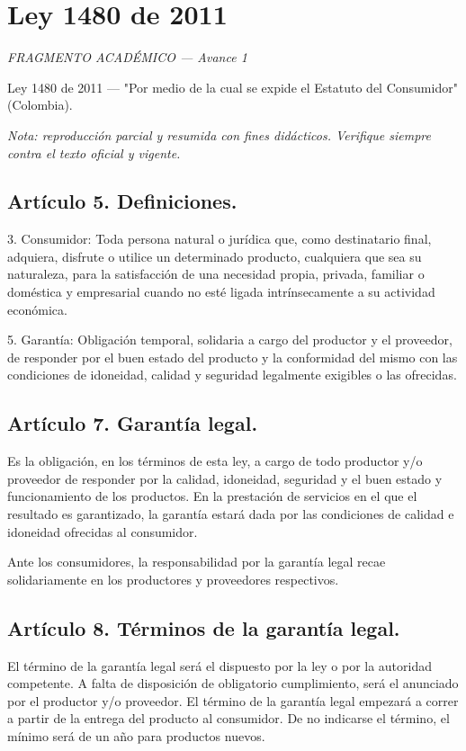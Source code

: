 \documentclass[11pt,a4paper]{article}
\begin{document}
\section*{Ley 1480 de 2011}

\textit{FRAGMENTO ACADÉMICO — Avance 1}

Ley 1480 de 2011 — "Por medio de la cual se expide el Estatuto del Consumidor" (Colombia).

\textit{Nota: reproducción parcial y resumida con fines didácticos. Verifique siempre contra el texto oficial y vigente.}

\subsection*{Artículo 5. Definiciones.}

3. Consumidor: Toda persona natural o jurídica que, como destinatario final, adquiera, disfrute o utilice un determinado producto, cualquiera que sea su naturaleza, para la satisfacción de una necesidad propia, privada, familiar o doméstica y empresarial cuando no esté ligada intrínsecamente a su actividad económica.

5. Garantía: Obligación temporal, solidaria a cargo del productor y el proveedor, de responder por el buen estado del producto y la conformidad del mismo con las condiciones de idoneidad, calidad y seguridad legalmente exigibles o las ofrecidas.

\subsection*{Artículo 7. Garantía legal.}

Es la obligación, en los términos de esta ley, a cargo de todo productor y/o proveedor de responder por la calidad, idoneidad, seguridad y el buen estado y funcionamiento de los productos. En la prestación de servicios en el que el resultado es garantizado, la garantía estará dada por las condiciones de calidad e idoneidad ofrecidas al consumidor.

Ante los consumidores, la responsabilidad por la garantía legal recae solidariamente en los productores y proveedores respectivos.

\subsection*{Artículo 8. Términos de la garantía legal.}

El término de la garantía legal será el dispuesto por la ley o por la autoridad competente. A falta de disposición de obligatorio cumplimiento, será el anunciado por el productor y/o proveedor. El término de la garantía legal empezará a correr a partir de la entrega del producto al consumidor. De no indicarse el término, el mínimo será de un año para productos nuevos.
\end{document}
